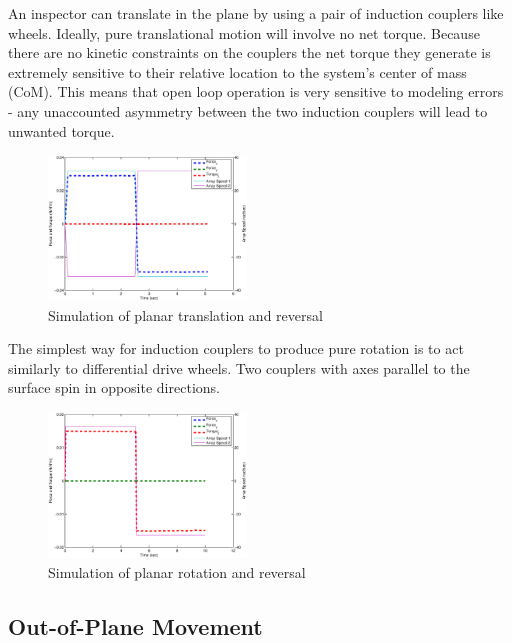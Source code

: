\documentclass[letterpaper, 10 pt, conference]{ieeeconf}  %
\begin{document}
  An inspector can translate in the plane by using a pair of induction couplers like wheels. Ideally, pure translational motion will involve no net torque. Because there are no kinetic constraints on the couplers the net torque they generate is extremely sensitive to their relative location to the system's center of mass (CoM)\label{def:com}. This means that open loop operation is very sensitive to modeling errors - any unaccounted asymmetry between the two induction couplers will lead to unwanted torque. 
     \begin{figure}[thpb]
      	\centering
  		\includegraphics[width = 0.47\textwidth]{figures/planar_translation.eps}
      		\caption{Simulation of planar translation and reversal}
      		\label{fig:planartranslation}
   \end{figure}
      
The simplest way for induction couplers to produce pure rotation is to act similarly to differential drive wheels. Two couplers with axes parallel to the surface spin in opposite directions.

      \begin{figure}[thpb]
      \centering
      \includegraphics[width = 0.47\textwidth]{figures/planar_rotations.eps}
      \caption{Simulation of planar rotation and reversal}
      \label{fig:planarrotation}
   \end{figure}

\subsection{Out-of-Plane Movement}
\end{document}
